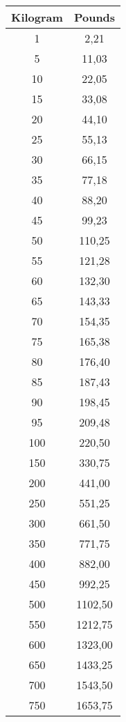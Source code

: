 \documentclass[10pt]{article}
\begin{document}
\begin{table}[!ht]
  \centering
  \tiny
  \begin{tabular}{|c|c|}
  \hline
  \cellcolor{black!90}\color{white}\textbf{Kilogram} & \cellcolor{black!90}\color{white}\textbf{Pounds} \\ \hline
      1 & 2,21 \\ \hline
      5 & 11,03 \\ \hline
      10 & 22,05 \\ \hline
      15 & 33,08 \\ \hline
      20 & 44,10 \\ \hline
      25 & 55,13 \\ \hline
      30 & 66,15 \\ \hline
      35 & 77,18 \\ \hline
      40 & 88,20 \\ \hline
      45 & 99,23 \\ \hline
      50 & 110,25 \\ \hline
      55 & 121,28 \\ \hline
      60 & 132,30 \\ \hline
      65 & 143,33 \\ \hline
      70 & 154,35 \\ \hline
      75 & 165,38 \\ \hline
      80 & 176,40 \\ \hline
      85 & 187,43 \\ \hline
      90 & 198,45 \\ \hline
      95 & 209,48 \\ \hline
      100 & 220,50 \\ \hline
      150 & 330,75 \\ \hline
      200 & 441,00 \\ \hline
      250 & 551,25 \\ \hline
      300 & 661,50 \\ \hline
      350 & 771,75 \\ \hline
      400 & 882,00 \\ \hline
      450 & 992,25 \\ \hline
      500 & 1102,50 \\ \hline
      550 & 1212,75 \\ \hline
      600 & 1323,00 \\ \hline
      650 & 1433,25 \\ \hline
      700 & 1543,50 \\ \hline
      750 & 1653,75 \\ \hline

\end{tabular}
\end{table}
\end{document}
